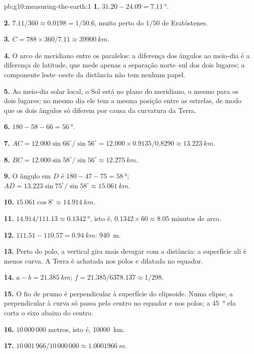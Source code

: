 \begin{solution}{pb:g10:measuring-the-earth:1}
\textbf{1.} $31.20 - 24.09 = \qty{7.11}{\degree}$.

\textbf{2.} $7.11/360 \approx 0.0198 = 1/50.6$, muito perto do $1/50$ de
Eratóstenes.

\textbf{3.} $C = 788 \times 360/7.11 \approx \qty{39900}{km}$.

\textbf{4.} O arco de meridiano entre os paralelos: a diferença dos ângulos
ao meio-dia é a diferença de latitude, que mede apenas a separação
norte--sul dos dois lugares; a componente leste--oeste da distância não
tem nenhum papel.

\textbf{5.} Ao meio-dia solar local, o Sol está no plano do meridiano, o
mesmo para os dois lugares; no mesmo dia ele tem a mesma posição entre as
estrelas, de modo que os dois ângulos só diferem por causa da curvatura da
Terra.

\textbf{6.} $180 - 58 - 66 = \qty{56}{\degree}$.

\textbf{7.} $AC = 12.000 \sin 66^\circ/\sin 56^\circ = 12.000 \times
0.9135/0.8290 \approx \qty{13.223}{km}$.

\textbf{8.} $BC = 12.000 \sin 58^\circ/\sin 56^\circ \approx \qty{12.275}{km}$.

\textbf{9.} O ângulo em $D$ é $180 - 47 - 75 = \qty{58}{\degree}$;
$AD = 13.223 \sin 75^\circ/\sin 58^\circ \approx \qty{15.061}{km}$.

\textbf{10.} $15.061 \cos 8^\circ \approx \qty{14.914}{km}$.

\textbf{11.} $14.914/111.13 \approx \qty{0.1342}{\degree}$, isto é,
$0.1342 \times 60 \approx 8.05$ minutos de arco.

\textbf{12.} $111.51 - 110.57 = \qty{0.94}{km}$: \qty{940}{m}.

\textbf{13.} Perto do polo, a vertical gira mais devagar com a distância: a
superfície ali é menos curva. A Terra é achatada nos polos e dilatada no
equador.

\textbf{14.} $a - b = \qty{21.385}{km}$; $f = 21.385/6378.137 \approx 1/298$.

\textbf{15.} O fio de prumo é perpendicular à superfície do elipsoide.
Numa elipse, a perpendicular à curva só passa pelo centro no equador e nos
polos; a \qty{45}{\degree} ela corta o eixo abaixo do centro.

\textbf{16.} $10\,000\,000$ metros, isto é, \qty{10000}{km}.

\textbf{17.} $10\,001\,966/10\,000\,000 \approx \qty{1.0001966}{m}$.


\end{solution}

